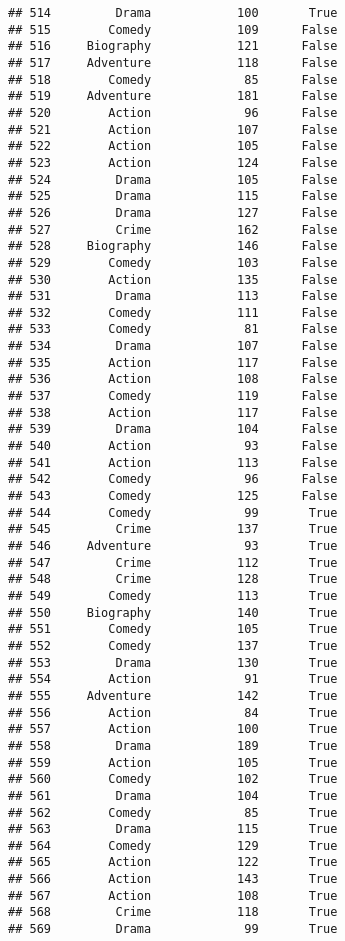 \documentclass[
]{article}
\begin{document}
\begin{verbatim}
## 514         Drama            100       True
## 515        Comedy            109      False
## 516     Biography            121      False
## 517     Adventure            118      False
## 518        Comedy             85      False
## 519     Adventure            181      False
## 520        Action             96      False
## 521        Action            107      False
## 522        Action            105      False
## 523        Action            124      False
## 524         Drama            105      False
## 525         Drama            115      False
## 526         Drama            127      False
## 527         Crime            162      False
## 528     Biography            146      False
## 529        Comedy            103      False
## 530        Action            135      False
## 531         Drama            113      False
## 532        Comedy            111      False
## 533        Comedy             81      False
## 534         Drama            107      False
## 535        Action            117      False
## 536        Action            108      False
## 537        Comedy            119      False
## 538        Action            117      False
## 539         Drama            104      False
## 540        Action             93      False
## 541        Action            113      False
## 542        Comedy             96      False
## 543        Comedy            125      False
## 544        Comedy             99       True
## 545         Crime            137       True
## 546     Adventure             93       True
## 547         Crime            112       True
## 548         Crime            128       True
## 549        Comedy            113       True
## 550     Biography            140       True
## 551        Comedy            105       True
## 552        Comedy            137       True
## 553         Drama            130       True
## 554        Action             91       True
## 555     Adventure            142       True
## 556        Action             84       True
## 557        Action            100       True
## 558         Drama            189       True
## 559        Action            105       True
## 560        Comedy            102       True
## 561         Drama            104       True
## 562        Comedy             85       True
## 563         Drama            115       True
## 564        Comedy            129       True
## 565        Action            122       True
## 566        Action            143       True
## 567        Action            108       True
## 568         Crime            118       True
## 569         Drama             99       True

\end{verbatim}
\end{document}
